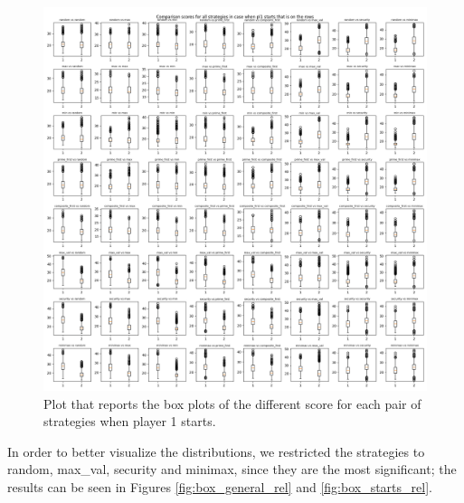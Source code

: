 \begin{figure}
	\centering
	\includegraphics[width=1\linewidth]{img/scores_p1first.png}
	\caption{Plot that reports the box plots of the different score for each pair of strategies when player 1 starts.}
	\label{fig:box_starts}
\end{figure}

In order to better visualize the distributions, we restricted the strategies to random, max\_val, security and minimax, since they are the most significant; the results can be seen in Figures \ref{fig:box_general_rel} and \ref{fig:box_starts_rel}.


